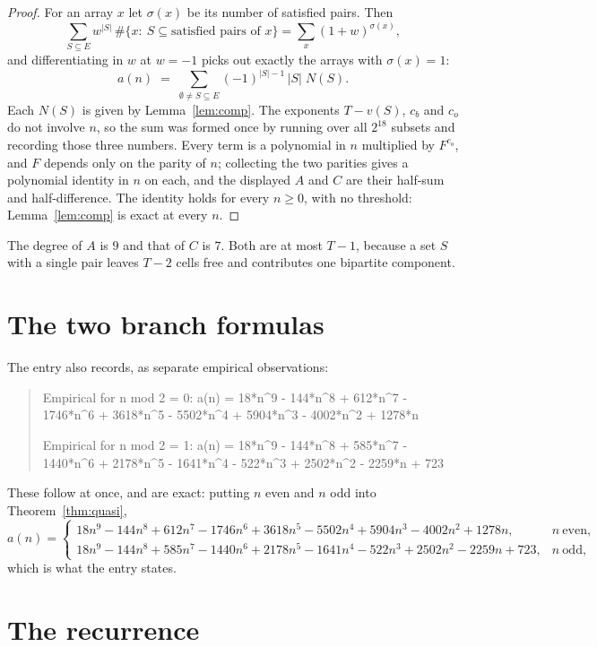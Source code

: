 \documentclass[11pt,a4paper]{article}
\theoremstyle{plain}
\theoremstyle{definition}
\begin{document}
\begin{proof}
For an array $x$ let $\sigma(x)$ be its number of satisfied pairs. Then
\[
\sum_{S\subseteq E}w^{|S|}\,\#\{x:\ S\subseteq\text{satisfied pairs of }x\}
=\sum_x (1+w)^{\sigma(x)},
\]
and differentiating in $w$ at $w=-1$ picks out exactly the arrays with $\sigma(x)=1$:
\[
a(n)\;=\;\sum_{\emptyset\neq S\subseteq E}(-1)^{|S|-1}\,|S|\;N(S).
\]
Each $N(S)$ is given by Lemma~\ref{lem:comp}. The exponents $T-v(S)$, $c_b$ and $c_o$ do not
involve $n$, so the sum was formed once by running over all $2^{18}$ subsets and
recording those three numbers. Every term is a polynomial in $n$ multiplied by $F^{c_o}$, and
$F$ depends only on the parity of $n$; collecting the two parities gives a polynomial identity
in $n$ on each, and the displayed $A$ and $C$ are their half-sum and half-difference. The
identity holds for every $n\ge0$, with no threshold: Lemma~\ref{lem:comp} is exact at every
$n$.
\end{proof}

The degree of $A$ is $9$ and that of $C$ is $7$. Both are at most $T-1$,
because a set $S$ with a single pair leaves $T-2$ cells free and contributes one bipartite
component.

\section{The two branch formulas}

The entry also records, as separate empirical observations:
\begin{quote}
Empirical for n mod 2 = 0: a(n) = 18*n\^{}9 - 144*n\^{}8 + 612*n\^{}7 - 1746*n\^{}6 + 3618*n\^{}5 - 5502*n\^{}4 + 5904*n\^{}3 - 4002*n\^{}2 + 1278*n

Empirical for n mod 2 = 1: a(n) = 18*n\^{}9 - 144*n\^{}8 + 585*n\^{}7 - 1440*n\^{}6 + 2178*n\^{}5 - 1641*n\^{}4 - 522*n\^{}3 + 2502*n\^{}2 - 2259*n + 723
\end{quote}
These follow at once, and are exact: putting $n$ even and $n$ odd into
Theorem~\ref{thm:quasi},
\[
a(n)=\begin{cases}
18n^{9} - 144n^{8} + 612n^{7} - 1746n^{6} + 3618n^{5} - 5502n^{4} + 5904n^{3} - 4002n^{2} + 1278n, & n\ \text{even},\\[2pt]
18n^{9} - 144n^{8} + 585n^{7} - 1440n^{6} + 2178n^{5} - 1641n^{4} - 522n^{3} + 2502n^{2} - 2259n + 723, & n\ \text{odd},
\end{cases}
\]
which is what the entry states.

\section{The recurrence}
\end{document}
